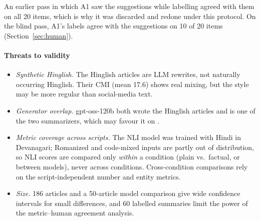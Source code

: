 An earlier pass in which A1 saw the suggestions while labelling agreed with them on all 20 items, which is why it was discarded and redone under this protocol. On the blind pass, A1's labels agree with the suggestions on 10 of 20 items (Section~\ref{sec:human}).

\paragraph{Threats to validity}
\begin{itemize}
  \item \emph{Synthetic Hinglish.} The Hinglish articles are LLM rewrites, not naturally occurring Hinglish. Their CMI (mean 17.6) shows real mixing, but the style may be more regular than social-media text.
  \item \emph{Generator overlap.} gpt-oss-120b both wrote the Hinglish articles and is one of the two summarizers, which may favour it on .
  \item \emph{Metric coverage across scripts.} The NLI model was trained with Hindi in Devanagari; Romanized and code-mixed inputs are partly out of distribution, so NLI scores are compared only \emph{within} a condition (plain vs.\ factual, or between models), never across conditions. Cross-condition comparisons rely on the script-independent number and entity metrics.
  \item \emph{Size.} 186 articles and a 50-article model comparison give wide confidence intervals for small differences, and 60 labelled summaries limit the power of the metric--human agreement analysis.
\end{itemize}
